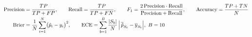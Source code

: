 \begin{align}
\text{Precision} &= \frac{TP}{TP + FP}, \qquad \text{Recall} = \frac{TP}{TP + FN}, \qquad
F_1 = \frac{2\,\text{Precision}\cdot\text{Recall}}{\text{Precision} + \text{Recall}}, \qquad
\text{Accuracy} = \frac{TP + TN}{N} \\
\text{Brier} &= \frac{1}{N}\sum_{i=1}^{N}\bigl(\hat{p}_i - y_i\bigr)^2, \qquad
\text{ECE} = \sum_{b=1}^{B} \frac{|S_b|}{N}\,\Bigl|\,\overline{\hat{p}}_{S_b} - \overline{y}_{S_b}\Bigr|,\ B = 10
\end{align}
